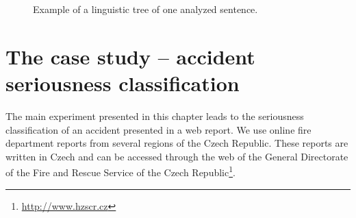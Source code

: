\begin{figure}
\centerline{}
\caption{Example of a linguistic tree of one analyzed sentence.}
\label{img:ch80_tree} \label{img:damage_tree}
\end{figure}














\section{The case study -- accident seriousness classification} \label{sec:ch80_case}



The main experiment presented in this chapter leads to the seriousness classification of an accident presented in a web report. %
We use online fire department reports from several regions of the Czech Republic. These reports are written in Czech and can be accessed through the web of the General Directorate of the Fire and Rescue Service of the Czech Republic\footnote{\url{http://www.hzscr.cz}}. 

